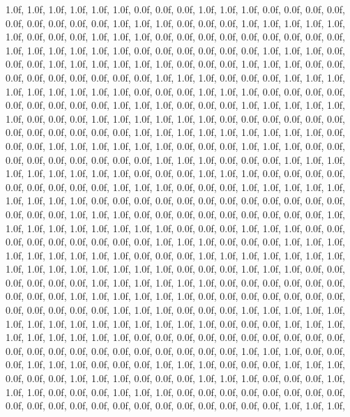 {   1.0f, 1.0f, 1.0f,   1.0f, 1.0f, 1.0f,   0.0f, 0.0f, 0.0f,   1.0f, 1.0f, 1.0f,   0.0f, 0.0f, 0.0f,   0.0f, 0.0f, 0.0f,   0.0f, 0.0f, 0.0f,   1.0f, 1.0f, 1.0f,   0.0f, 0.0f, 0.0f,   1.0f, 1.0f, 1.0f,   1.0f, 1.0f, 1.0f,   0.0f, 0.0f, 0.0f,   1.0f, 1.0f, 1.0f,   0.0f, 0.0f, 0.0f,   0.0f, 0.0f, 0.0f,   0.0f, 0.0f, 0.0f,   1.0f, 1.0f, 1.0f,   1.0f, 1.0f, 1.0f,   0.0f, 0.0f, 0.0f,   0.0f, 0.0f, 0.0f,   1.0f, 1.0f, 1.0f,   0.0f, 0.0f, 0.0f,   1.0f, 1.0f, 1.0f,   1.0f, 1.0f, 1.0f,   0.0f, 0.0f, 0.0f,   1.0f, 1.0f, 1.0f,   0.0f, 0.0f, 0.0f,   0.0f, 0.0f, 0.0f,   0.0f, 0.0f, 0.0f,   1.0f, 1.0f, 1.0f,   0.0f, 0.0f, 0.0f,   1.0f, 1.0f, 1.0f,   
   1.0f, 1.0f, 1.0f,   1.0f, 1.0f, 1.0f,   0.0f, 0.0f, 0.0f,   1.0f, 1.0f, 1.0f,   0.0f, 0.0f, 0.0f,   0.0f, 0.0f, 0.0f,   0.0f, 0.0f, 0.0f,   1.0f, 1.0f, 1.0f,   0.0f, 0.0f, 0.0f,   1.0f, 1.0f, 1.0f,   1.0f, 1.0f, 1.0f,   0.0f, 0.0f, 0.0f,   1.0f, 1.0f, 1.0f,   1.0f, 1.0f, 1.0f,   0.0f, 0.0f, 0.0f,   0.0f, 0.0f, 0.0f,   0.0f, 0.0f, 0.0f,   0.0f, 0.0f, 0.0f,   1.0f, 1.0f, 1.0f,   1.0f, 1.0f, 1.0f,   1.0f, 1.0f, 1.0f,   0.0f, 0.0f, 0.0f,   1.0f, 1.0f, 1.0f,   1.0f, 1.0f, 1.0f,   0.0f, 0.0f, 0.0f,   1.0f, 1.0f, 1.0f,   0.0f, 0.0f, 0.0f,   0.0f, 0.0f, 0.0f,   0.0f, 0.0f, 0.0f,   1.0f, 1.0f, 1.0f,   0.0f, 0.0f, 0.0f,   1.0f, 1.0f, 1.0f,   
   1.0f, 1.0f, 1.0f,   1.0f, 1.0f, 1.0f,   0.0f, 0.0f, 0.0f,   1.0f, 1.0f, 1.0f,   0.0f, 0.0f, 0.0f,   0.0f, 0.0f, 0.0f,   0.0f, 0.0f, 0.0f,   1.0f, 1.0f, 1.0f,   0.0f, 0.0f, 0.0f,   1.0f, 1.0f, 1.0f,   1.0f, 1.0f, 1.0f,   1.0f, 1.0f, 1.0f,   0.0f, 0.0f, 0.0f,   0.0f, 0.0f, 0.0f,   0.0f, 0.0f, 0.0f,   0.0f, 0.0f, 0.0f,   0.0f, 0.0f, 0.0f,   1.0f, 1.0f, 1.0f,   0.0f, 0.0f, 0.0f,   0.0f, 0.0f, 0.0f,   0.0f, 0.0f, 0.0f,   1.0f, 1.0f, 1.0f,   1.0f, 1.0f, 1.0f,   1.0f, 1.0f, 1.0f,   0.0f, 0.0f, 0.0f,   1.0f, 1.0f, 1.0f,   0.0f, 0.0f, 0.0f,   0.0f, 0.0f, 0.0f,   0.0f, 0.0f, 0.0f,   1.0f, 1.0f, 1.0f,   0.0f, 0.0f, 0.0f,   1.0f, 1.0f, 1.0f,   
   1.0f, 1.0f, 1.0f,   1.0f, 1.0f, 1.0f,   0.0f, 0.0f, 0.0f,   1.0f, 1.0f, 1.0f,   1.0f, 1.0f, 1.0f,   1.0f, 1.0f, 1.0f,   1.0f, 1.0f, 1.0f,   1.0f, 1.0f, 1.0f,   0.0f, 0.0f, 0.0f,   1.0f, 1.0f, 1.0f,   0.0f, 0.0f, 0.0f,   0.0f, 0.0f, 0.0f,   1.0f, 1.0f, 1.0f,   1.0f, 1.0f, 1.0f,   0.0f, 0.0f, 0.0f,   0.0f, 0.0f, 0.0f,   0.0f, 0.0f, 0.0f,   1.0f, 1.0f, 1.0f,   1.0f, 1.0f, 1.0f,   0.0f, 0.0f, 0.0f,   0.0f, 0.0f, 0.0f,   0.0f, 0.0f, 0.0f,   0.0f, 0.0f, 0.0f,   1.0f, 1.0f, 1.0f,   0.0f, 0.0f, 0.0f,   1.0f, 1.0f, 1.0f,   1.0f, 1.0f, 1.0f,   1.0f, 1.0f, 1.0f,   1.0f, 1.0f, 1.0f,   1.0f, 1.0f, 1.0f,   0.0f, 0.0f, 0.0f,   1.0f, 1.0f, 1.0f,   
   1.0f, 1.0f, 1.0f,   1.0f, 1.0f, 1.0f,   0.0f, 0.0f, 0.0f,   0.0f, 0.0f, 0.0f,   0.0f, 0.0f, 0.0f,   0.0f, 0.0f, 0.0f,   0.0f, 0.0f, 0.0f,   0.0f, 0.0f, 0.0f,   0.0f, 0.0f, 0.0f,   1.0f, 1.0f, 1.0f,   0.0f, 0.0f, 0.0f,   1.0f, 1.0f, 1.0f,   0.0f, 0.0f, 0.0f,   1.0f, 1.0f, 1.0f,   0.0f, 0.0f, 0.0f,   1.0f, 1.0f, 1.0f,   0.0f, 0.0f, 0.0f,   1.0f, 1.0f, 1.0f,   0.0f, 0.0f, 0.0f,   1.0f, 1.0f, 1.0f,   0.0f, 0.0f, 0.0f,   1.0f, 1.0f, 1.0f,   0.0f, 0.0f, 0.0f,   1.0f, 1.0f, 1.0f,   0.0f, 0.0f, 0.0f,   0.0f, 0.0f, 0.0f,   0.0f, 0.0f, 0.0f,   0.0f, 0.0f, 0.0f,   0.0f, 0.0f, 0.0f,   0.0f, 0.0f, 0.0f,   0.0f, 0.0f, 0.0f,   1.0f, 1.0f, 1.0f,   
}

